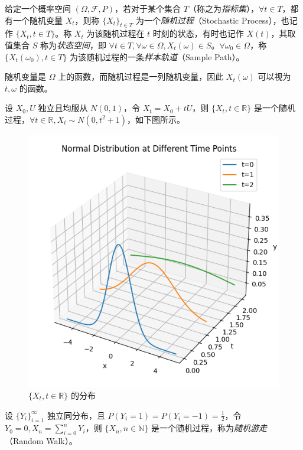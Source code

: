 \documentclass[../main.tex]{subfiles}
\begin{document}
\begin{definition*}
    给定一个概率空间 $(\Omega,\mathcal F,P)$，若对于某个集合 $T$（称之为\emph{指标集}），$\forall t\in T$，都有一个随机变量 $X_t$，则称 $\{X_t\}_{t\in T}$ 为一个\emph{随机过程}（Stochastic Process），也记作 $\{X_t,t\in T\}$。称 $X_t$ 为该随机过程在 $t$ 时刻的状态，有时也记作 $X(t)$，其取值集合 $S$ 称为\emph{状态空间}，即 $\forall t\in T,\forall \omega\in\Omega,X_t(\omega)\in S$。$\forall\omega_0\in\Omega$，称 $\{X_t(\omega_0),t\in T\}$ 为该随机过程的一条\emph{样本轨道}（Sample Path）。
\end{definition*}

随机变量是 $\Omega$ 上的函数，而随机过程是一列随机变量，因此 $X_t(\omega)$ 可以视为 $t,\omega$ 的函数。

\begin{example*}
    设 $X_0,U$ 独立且均服从 $N(0,1)$，令 $X_t=X_0+tU$，则 $\{X_t,t\in\mathbb R\}$ 是一个随机过程，$\forall t\in\mathbb R,X_t\sim N(0,t^2+1)$，如下图所示。
\end{example*}

\begin{figure}[!h]
    \centering
    \includegraphics[scale=0.7]{figures/SP_exp1.png}
    \caption*{$\{X_t,t\in\mathbb R\}$ 的分布}
\end{figure}

\begin{example*}
    设 $\{Y_i\}_{i=1}^\infty$ 独立同分布，且 $P(Y_i=1)=P(Y_i=-1)=\frac12$，令 $Y_0=0,X_n=\sum_{i=0}^nY_i$，则 $\{X_n,n\in\mathbb N\}$ 是一个随机过程，称为\emph{随机游走}（Random Walk）。
\end{example*}
\end{document}
